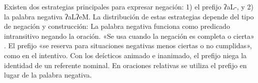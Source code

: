 Existen dos estrategias principales para expresar negación: 1) el prefijo {\setmainfont{Doulos SIL}ʔaL-}, y 2) la palabra negativa {\setmainfont{Doulos SIL}ʔaLʔeM}. La distribución de estas estrategias depende del tipo de negación y construcción: La palabra negativa funciona como predicado intransitivo negando la oración. «Se usa cuando la negación es completa o cierta» \textcolor{MidnightBlue}{\citep[pág. 32]{chinanteco}}. El prefijo «se reserva para situaciones negativas menos ciertas o no cumplidas», como en el intentivo. Con los deícticos animado e inanimado, el prefijo niega la identidad de un referente nominal. En oraciones relativas se utiliza el prefijo en lugar de la palabra negativa.